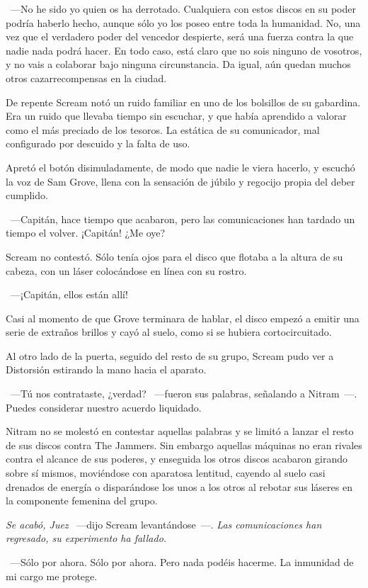 ~---No he sido yo quien os ha derrotado. Cualquiera con estos discos en su poder podría haberlo hecho, aunque sólo yo los poseo entre toda la humanidad. No, una vez que el verdadero poder del vencedor despierte, será una fuerza contra la que nadie nada podrá hacer. En todo caso, está claro que no sois ninguno de vosotros, y no vais a colaborar bajo ninguna circunstancia. Da igual, aún quedan muchos otros cazarrecompensas en la ciudad.

De repente Scream notó un ruido familiar en uno de los bolsillos de su gabardina. Era un ruido que llevaba tiempo sin escuchar, y que había aprendido a valorar como el más preciado de los tesoros. La estática de su comunicador, mal configurado por descuido y la falta de uso.

Apretó el botón disimuladamente, de modo que nadie le viera hacerlo, y escuchó la voz de Sam Grove, llena con la sensación de júbilo y regocijo propia del deber cumplido.

~---Capitán, hace tiempo que acabaron, pero las comunicaciones han tardado un tiempo el volver. ¡Capitán! ¿Me oye?

Scream no contestó. Sólo tenía ojos para el disco que flotaba a la altura de su cabeza, con un láser colocándose en línea con su rostro.

~---¡Capitán, ellos están allí!

Casi al momento de que Grove terminara de hablar, el disco empezó a emitir una serie de extraños brillos y cayó al suelo, como si se hubiera cortocircuitado.

Al otro lado de la puerta, seguido del resto de su grupo, Scream pudo ver a Distorsión estirando la mano hacia el aparato.

~---Tú nos contrataste, ¿verdad? ~---fueron sus palabras, señalando a Nitram~---. Puedes considerar nuestro acuerdo liquidado.

Nitram no se molestó en contestar aquellas palabras y se limitó a lanzar el resto de sus discos contra The Jammers. Sin embargo aquellas máquinas no eran rivales contra el alcance de sus poderes, y enseguida los otros discos acabaron girando sobre sí mismos, moviéndose con aparatosa lentitud, cayendo al suelo casi drenados de energía o disparándose los unos a los otros al rebotar sus láseres en la componente femenina del grupo.

\emph{Se acabó, Juez} ~---dijo Scream levantándose~---. \emph{Las comunicaciones han regresado, su experimento ha fallado.}

~---Sólo por ahora. Sólo por ahora. Pero nada podéis hacerme. La inmunidad de mi cargo me protege.

